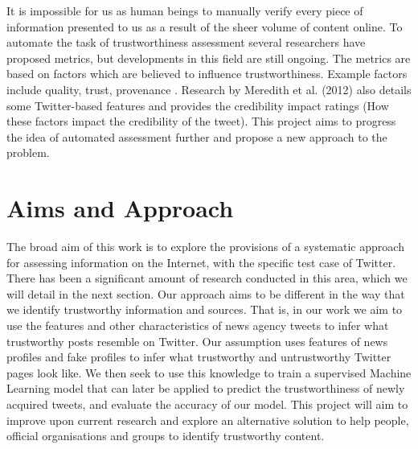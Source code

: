It is impossible for us as human beings to manually verify every piece of information presented to us as a result of the sheer volume of content online. To automate the task of trustworthiness assessment several researchers have proposed metrics, but developments in this field are still ongoing. The metrics are based on factors which are believed to influence trustworthiness. Example factors include quality, trust, provenance \cite{13}. Research by Meredith et al. (2012)\cite{17} also details some Twitter-based features and provides the credibility impact ratings (How these factors impact the credibility of the tweet). This project aims to progress the idea of automated assessment further and propose a new approach to the problem. 
\section{Aims and Approach}
The broad aim of this work is to explore the provisions of a systematic approach for assessing information on the Internet, with the specific test case of Twitter. There has been a significant amount of research conducted in this area, which we will detail in the next section. Our approach aims to be different in the way that we identify trustworthy information and sources. That is, in our work we aim to use the features and other characteristics of news agency tweets to infer what trustworthy posts resemble on Twitter. Our assumption uses features of news profiles and fake profiles to infer what trustworthy and untrustworthy Twitter pages look like. We then seek to use this knowledge to train a supervised Machine Learning model that can later be applied to predict the trustworthiness of newly acquired tweets, and evaluate the accuracy of our model. This project will aim to improve upon current research and explore an alternative solution to help people, official organisations and groups to identify trustworthy content.  
